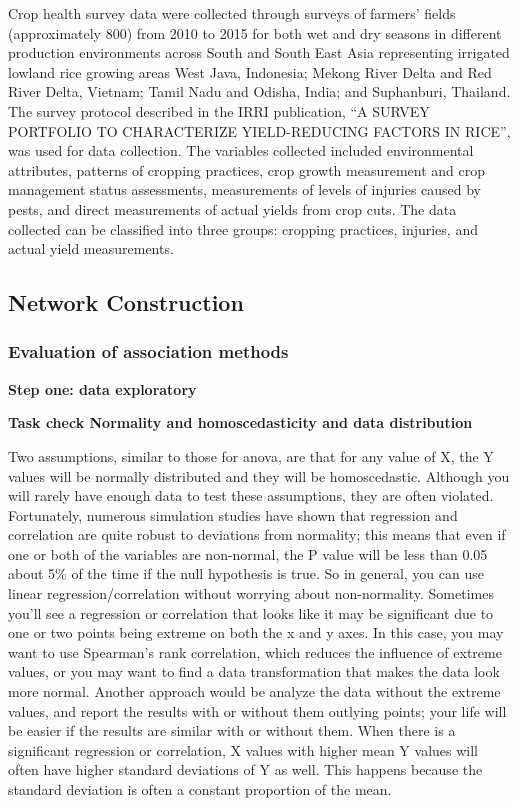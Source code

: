 \documentclass[a4paper]{article}
\begin{document}
Crop health survey data were collected through surveys of farmers' fields (approximately 800) from 2010 to 2015 for both wet and dry seasons in different production environments across South and South East Asia representing irrigated lowland rice growing areas West Java, Indonesia; Mekong River Delta and Red River Delta, Vietnam; Tamil Nadu and Odisha, India; and Suphanburi, Thailand. The survey protocol described in the IRRI publication, ``A SURVEY PORTFOLIO TO CHARACTERIZE YIELD-REDUCING FACTORS IN RICE'', \citep{Savarysurvey2009} was used for data collection. The variables collected included environmental attributes, patterns of cropping practices, crop growth measurement and crop management status assessments, measurements of levels of injuries caused by pests, and direct measurements of actual yields from crop cuts. The data collected can be classified into three groups: cropping practices, injuries, and actual yield measurements.

\subsection{Network Construction}

\subsubsection{Evaluation of association methods}

\textbf{Step one: data exploratory}


\textbf{Task check Normality and homoscedasticity and data distribution}

 Two assumptions, similar to those for anova, are that for any value of X, the Y values will be normally distributed and they will be homoscedastic. Although you will rarely have enough data to test these assumptions, they are often violated.
Fortunately, numerous simulation studies have shown that regression and correlation are quite robust to deviations from normality; this means that even if one or both of the variables are non-normal, the P value will be less than 0.05 about 5\% of the time if the null hypothesis is true. So in general, you can use linear regression/correlation without worrying about non-normality.
Sometimes you'll see a regression or correlation that looks like it may be significant due to one or two points being extreme on both the x and y axes. In this case, you may want to use Spearman's rank correlation, which reduces the influence of extreme values, or you may want to find a data transformation that makes the data look more normal. Another approach would be analyze the data without the extreme values, and report the results with or without them outlying points; your life will be easier if the results are similar with or without them.
When there is a significant regression or correlation, X values with higher mean Y values will often have higher standard deviations of Y as well. This happens because the standard deviation is often a constant proportion of the mean. 
\end{document}
